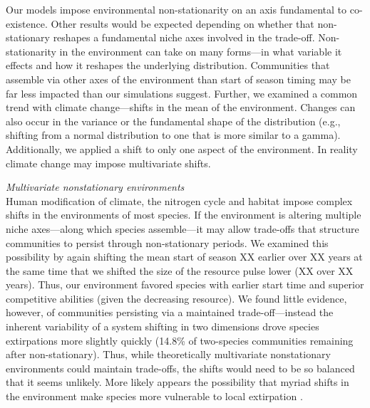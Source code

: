 \documentclass[11pt,letterpaper]{article}
\begin{document}
Our models impose environmental non-stationarity on an axis fundamental to co-existence. Other results would be expected depending on whether that non-stationary reshapes a fundamental niche axes involved in the trade-off. Non-stationarity in the environment can take on many forms---in what variable it effects and how it reshapes the underlying distribution. Communities that assemble via other axes of the environment than start of season timing may be far less impacted than our simulations suggest. Further, we examined a common trend with climate change---shifts in the mean of the environment. Changes can also occur in the variance or the fundamental shape of the distribution (e.g., shifting from a normal distribution to one that is more similar to a gamma). Additionally, we applied a shift to only one aspect of the environment. In reality climate change may impose multivariate shifts.

\emph{Multivariate nonstationary environments}\\
Human modification of climate, the nitrogen cycle and habitat impose complex shifts in the environments of most species. If the environment is altering multiple niche axes---along which species assemble---it may allow trade-offs that structure communities to persist through non-stationary periods. We examined this possibility by again shifting the mean start of season XX earlier over XX years at the same time that we shifted the size of the resource pulse lower (XX over XX years). Thus, our environment favored species with earlier start time and superior competitive abilities (given the decreasing resource). We found little evidence, however, of communities persisting via a maintained trade-off---instead the inherent variability of a system shifting in two dimensions drove species extirpations more slightly quickly (14.8\% of two-species communities remaining after non-stationary). Thus, while theoretically multivariate nonstationary environments could maintain trade-offs, the shifts would need to be so balanced that it seems unlikely. More likely appears the possibility that myriad shifts in the environment make species more vulnerable to local extirpation \citep{sixthectinction2011,IPCC:2014sm}.
\end{document}
